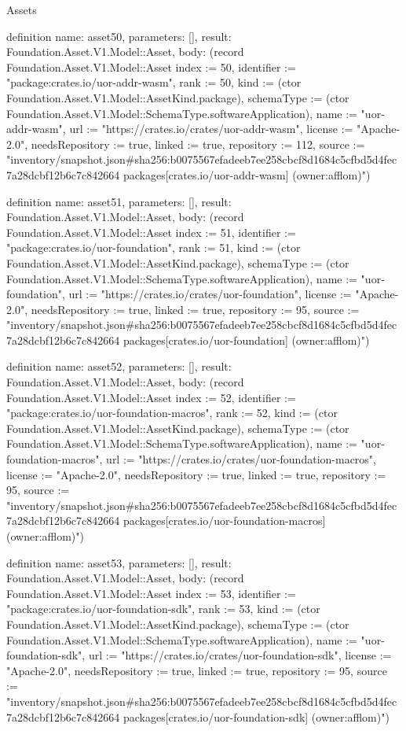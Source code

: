 \begin{lexlean}{Assets}
\begin{semanticmodule}
definition{
  name: asset50,
  parameters: [],
  result: Foundation.Asset.V1.Model::Asset,
  body: (record Foundation.Asset.V1.Model::Asset {index := 50, identifier := "package:crates.io/uor-addr-wasm", rank := 50, kind := (ctor Foundation.Asset.V1.Model::AssetKind.package), schemaType := (ctor Foundation.Asset.V1.Model::SchemaType.softwareApplication), name := "uor-addr-wasm", url := "https://crates.io/crates/uor-addr-wasm", license := "Apache-2.0", needsRepository := true, linked := true, repository := 112, source := "inventory/snapshot.json#sha256:b0075567efadeeb7ee258cbcf8d1684c5cfbd5d4fec7a28dcbf12b6c7c842664 packages[crates.io/uor-addr-wasm] (owner:afflom)"})
}

definition{
  name: asset51,
  parameters: [],
  result: Foundation.Asset.V1.Model::Asset,
  body: (record Foundation.Asset.V1.Model::Asset {index := 51, identifier := "package:crates.io/uor-foundation", rank := 51, kind := (ctor Foundation.Asset.V1.Model::AssetKind.package), schemaType := (ctor Foundation.Asset.V1.Model::SchemaType.softwareApplication), name := "uor-foundation", url := "https://crates.io/crates/uor-foundation", license := "Apache-2.0", needsRepository := true, linked := true, repository := 95, source := "inventory/snapshot.json#sha256:b0075567efadeeb7ee258cbcf8d1684c5cfbd5d4fec7a28dcbf12b6c7c842664 packages[crates.io/uor-foundation] (owner:afflom)"})
}

definition{
  name: asset52,
  parameters: [],
  result: Foundation.Asset.V1.Model::Asset,
  body: (record Foundation.Asset.V1.Model::Asset {index := 52, identifier := "package:crates.io/uor-foundation-macros", rank := 52, kind := (ctor Foundation.Asset.V1.Model::AssetKind.package), schemaType := (ctor Foundation.Asset.V1.Model::SchemaType.softwareApplication), name := "uor-foundation-macros", url := "https://crates.io/crates/uor-foundation-macros", license := "Apache-2.0", needsRepository := true, linked := true, repository := 95, source := "inventory/snapshot.json#sha256:b0075567efadeeb7ee258cbcf8d1684c5cfbd5d4fec7a28dcbf12b6c7c842664 packages[crates.io/uor-foundation-macros] (owner:afflom)"})
}

definition{
  name: asset53,
  parameters: [],
  result: Foundation.Asset.V1.Model::Asset,
  body: (record Foundation.Asset.V1.Model::Asset {index := 53, identifier := "package:crates.io/uor-foundation-sdk", rank := 53, kind := (ctor Foundation.Asset.V1.Model::AssetKind.package), schemaType := (ctor Foundation.Asset.V1.Model::SchemaType.softwareApplication), name := "uor-foundation-sdk", url := "https://crates.io/crates/uor-foundation-sdk", license := "Apache-2.0", needsRepository := true, linked := true, repository := 95, source := "inventory/snapshot.json#sha256:b0075567efadeeb7ee258cbcf8d1684c5cfbd5d4fec7a28dcbf12b6c7c842664 packages[crates.io/uor-foundation-sdk] (owner:afflom)"})
}


\end{semanticmodule}
\end{lexlean}
